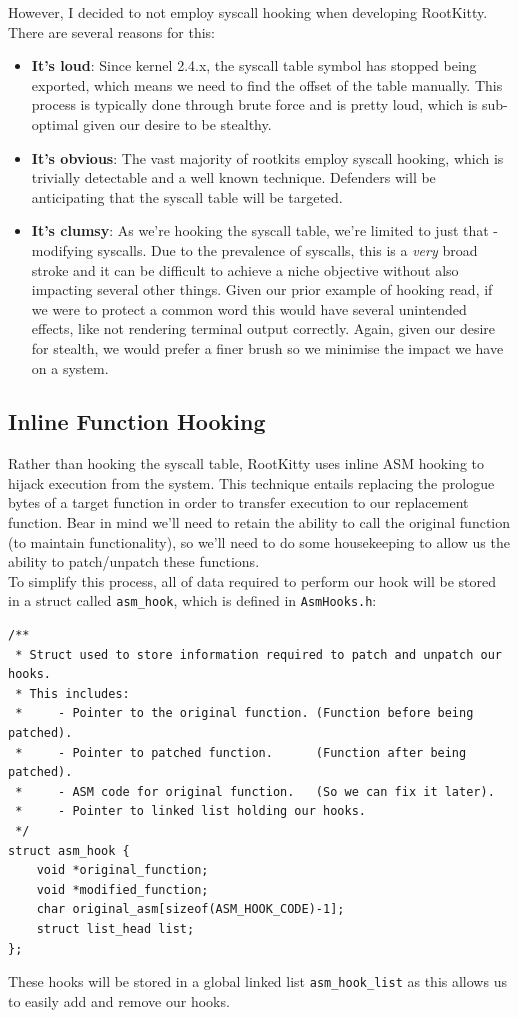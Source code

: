 \documentclass[11pt]{article}
\begin{document}
However, I decided to not employ syscall hooking when developing RootKitty. There are several reasons for this:
\begin{itemize}
\itemsep0em
\item \textbf{It's loud}: Since kernel 2.4.x, the syscall table symbol has stopped being exported, which means we need to find the offset of the table manually. This process is typically done through brute force and is pretty loud, which is sub-optimal given our desire to be stealthy.
\item \textbf{It's obvious}: The vast majority of rootkits employ syscall hooking, which is trivially detectable and a well known technique. Defenders will be anticipating that the syscall table will be targeted.
\item \textbf{It's clumsy}: As we're hooking the syscall table, we're limited to just that - modifying syscalls. Due to the prevalence of syscalls, this is a \textit{very} broad stroke and it can be difficult to achieve a niche objective without also impacting several other things. Given our prior example of hooking read, if we were to protect a common word this would have several unintended effects, like not rendering terminal output correctly. Again, given our desire for stealth, we would prefer a finer brush so we minimise the impact we have on a system.
\end{itemize}

\subsection{Inline Function Hooking}
Rather than hooking the syscall table, RootKitty uses inline ASM hooking to hijack execution from the system. This technique entails replacing the prologue bytes of a target function in order to transfer execution to our replacement function. Bear in mind we'll need to retain the ability to call the original function (to maintain functionality), so we'll need to do some housekeeping to allow us the ability to patch/unpatch these functions.\\

To simplify this process, all of data required to perform our hook will be stored in a struct called \texttt{asm_hook}, which is defined in \texttt{AsmHooks.h}:
\begin{verbatim}
/** 
 * Struct used to store information required to patch and unpatch our hooks.
 * This includes:
 *     - Pointer to the original function. (Function before being patched).
 *     - Pointer to patched function.      (Function after being patched).
 *     - ASM code for original function.   (So we can fix it later).
 *     - Pointer to linked list holding our hooks.
 */
struct asm_hook {
    void *original_function;
    void *modified_function;
    char original_asm[sizeof(ASM_HOOK_CODE)-1];
    struct list_head list;
};	
\end{verbatim}
These hooks will be stored in a global linked list \texttt{asm_hook_list} as this allows us to easily add and remove our hooks.
\end{document}

